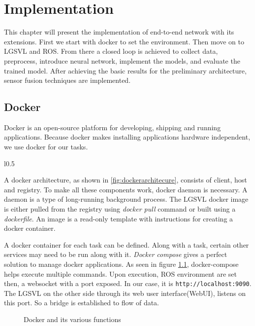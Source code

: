\chapter{Implementation}
\label{chapter:implementation}
This chapter will present the implementation of end-to-end network with its extensions.
First we start with docker to set the environment. Then move on to LGSVL and ROS.
From there a closed loop is achieved to collect data, preprocess, introduce neural
network, implement the models, and evaluate the trained model. After achieving the basic results for the
preliminary architecture, sensor fusion techniques are implemented.

\section{Docker}
Docker is an open-source platform for developing, shipping and running applications.
Because docker makes installing applications hardware independent, we use docker for our
tasks.
\begin{wrapfigure}{l}{0.5\textwidth}
	\centering
    \def\svgwidth{0.5\textwidth}
    \caption{Docker Engine and its functions}
    \label{fig:dockerengine}
\end{wrapfigure}

A docker architecture, as shown in \ref{fig:dockerarchitecure}, consists of client, host
and registry. To make all these components work, docker daemon is necessary. A daemon is a
type of long-running background process. The LGSVL docker image is either pulled from the registry using
\textit{docker pull} command or built using a \textit{dockerfile}. An image is a read-only template with instructions for
creating a docker container.

A docker container for each task can be defined. Along with a task, certain other
services may need to be run along with it. \textit{Docker compose} gives a perfect
solution to manage docker applications. As seen in figure \ref{fig:docker1},
docker-compose helps execute multiple commands. Upon execution, ROS environment are set
then, a websocket with a port exposed. In our case, it is \texttt{http://localhost:9090}.
The LGSVL on the other side through its web user interface(WebUI), listens on this port. So a bridge is
established to flow of data.
\begin{figure}[!ht]
    \centering
    \def\svgwidth{0.8\textwidth}
    \caption{Docker and its various functions}
    \label{fig:docker1}
\end{figure}


